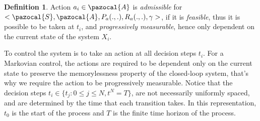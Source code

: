 \documentclass[12pt]{aastex62}
\theoremstyle{definition}
\newtheorem{defn}{Definition}
\begin{document}
\begin{defn}
Action $a_{i} \in \pazocal{A}$ is \textit{admissible} for $<\pazocal{S},\pazocal{A}, P_a(.,.), R_a(.,.), \gamma>$, if it is \textit{feasible}, thus it is possible to be taken at $t_i$, and \textit{progressively measurable}, hence only dependent on the current state of the system $X_i$.
\end{defn}
To control the system is to take an action at all decision steps $t_i$. For a Markovian control, the actions are required to be dependent only on the current state to preserve the memorylessness property of the closed-loop system, that's why we require the action to be progressively measurable. Notice that the decision steps $t_i \in \{ t_j: 0 \leq j \leq N, t^N  =T\}$, are not necessarily uniformly spaced, and are determined by the time that each transition takes. In this representation, $t_0$ is the start of the process and $T$ is the finite time horizon of the process.
\end{document}

